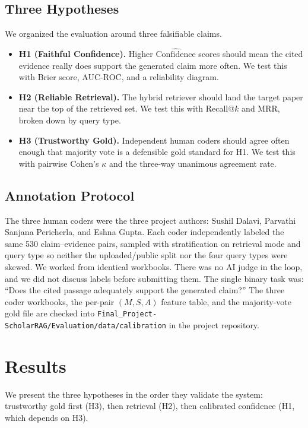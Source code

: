 \documentclass[10pt]{article}
\begin{document}
\subsection{Three Hypotheses}
We organized the evaluation around three falsifiable claims.
\begin{itemize}
    \item \textbf{H1 (Faithful Confidence).} Higher
    $\widehat{\text{Confidence}}$ scores should mean the cited
    evidence really does support the generated claim more often. We
    test this with Brier score, AUC-ROC, and a reliability diagram.
    \item \textbf{H2 (Reliable Retrieval).} The hybrid retriever
    should land the target paper near the top of the retrieved set.
    We test this with Recall@$k$ and MRR, broken down by query type.
    \item \textbf{H3 (Trustworthy Gold).} Independent human coders
    should agree often enough that majority vote is a defensible gold
    standard for H1. We test this with pairwise Cohen's $\kappa$
    and the three-way unanimous agreement rate.
\end{itemize}

\subsection{Annotation Protocol}
The three human coders were the three project authors: Sushil
Dalavi, Parvathi Sanjana Pericherla, and Eshna Gupta. Each coder
independently labeled the same 530 claim--evidence pairs, sampled
with stratification on retrieval mode and query type so neither the
uploaded/public split nor the four query types were skewed. We
worked from identical workbooks. There was no AI judge in the loop,
and we did not discuss labels before submitting them. The single
binary task was: ``Does the cited passage adequately support the
generated claim?'' The three coder workbooks, the per-pair $(M, S,
A)$ feature table, and the majority-vote gold file are checked into
\texttt{Final\_Project-ScholarRAG/Evaluation/data/calibration} in
the project repository.

\section{Results}
\label{sec:results}

We present the three hypotheses in the order they validate the
system: trustworthy gold first (H3), then retrieval (H2), then
calibrated confidence (H1, which depends on H3).
\end{document}
